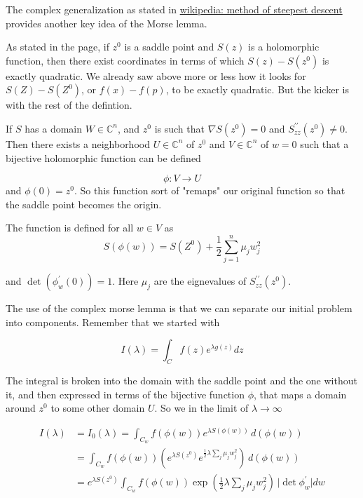 The complex generalization as stated in
\href{https://en.wikipedia.org/wiki/Method_of_steepest_descent#Complex_Morse_lemma}{wikipedia: method of steepest descent}
provides another key idea of the Morse lemma.

As stated in the page,
if $z^0$ is a saddle point and $S(z)$ is a holomorphic function, then there exist coordinates in terms
of which $S(z) - S(z^0)$ is exactly quadratic.
We already saw above more or less how it looks for $S(Z) - S(Z^0)$, or $f(x) - f(p)$, to be exactly quadratic.
But the kicker is with the rest of the defintion.

If $S$ has a domain $W \in \mathbb{C}^n$, and $z^0$ is such that $\nabla S(z^0) = 0$ and
$S^{\prime\prime}_{zz} (z^0) \neq 0$.
Then there exists a neighborhood $U \in \mathbb{C}^n$ of $z^0$ and $V \in \mathbb{C}^n$ of $w=0$
such that a bijective holomorphic function can be defined

$$
\phi : V \rightarrow U
$$
and $\phi(0) = z^0$.
So this function sort of "remaps" our original function so that the saddle point becomes the origin.

The function is defined for all $w \in V$ as
$$
S(\phi(w))
=
S(Z^0) + \frac{1}{2} \sum_{j=1}^{n} \mu_j w_{j}^{2}
$$

and $\det(\phi^{\prime}_{w} (0)) = 1$.
Here $\mu_j$ are the eignevalues of $S^{\prime\prime}_{zz} (z^0)$.

The use of the complex morse lemma is that we can separate our initial problem into components.
Remember that we started with

$$
I(\lambda) =
\int_{C} f(z) e^{\lambda g(z)} dz
$$

The integral is broken into the domain with the saddle point and the one without it, and then expressed in terms of
the bijective function $\phi$, that maps a domain around $z^0$ to some other domain $U$.
So we in the limit of $\lambda \rightarrow \infty$

\begin{align*}
I(\lambda) &= I_0 (\lambda) =
\int_{C_w} f(\phi(w)) e^{\lambda S(\phi(w))} \, d\left(\phi (w)\right) \\
&= \int_{C_w} f(\phi(w)) \left( e^{\lambda S(z^0)} e^{\frac{1}{2} \lambda \sum_j \mu_j w_{j}^{2}} \right) \, d\left(\phi (w)\right) \\
&= e^{\lambda S(z^0)} \int_{C_w} f(\phi(w)) \exp\left( \frac{1}{2} \lambda \sum_j \mu_j w_{j}^{2} \right) \, \Big| \det \phi^{\prime}_{w}\Big| dw
\end{align*}

